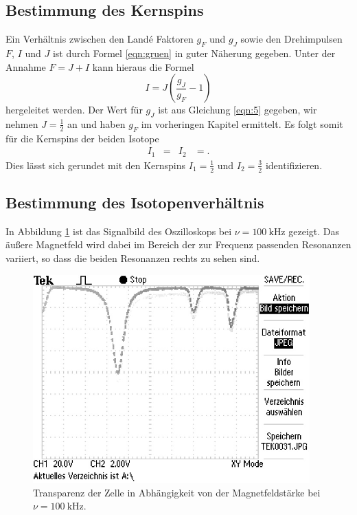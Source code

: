 \subsection{Bestimmung des Kernspins}

Ein Verhältnis zwischen den Land\'{e} Faktoren $g_F$ und $g_J$ sowie den Drehimpulsen $F$, $I$ und $J$ ist durch Formel \eqref{eqn:gruen} in guter Näherung gegeben.
Unter der Annahme $F = J+I$ kann hieraus die Formel
\begin{equation}
  I = J ( \frac{g_J}{g_F} - 1)
\end{equation}
hergeleitet werden.
Der Wert für $g_J$ ist aus Gleichung \eqref{eqn:5} gegeben, wir nehmen $J = \frac{1}{2}$ an und haben $g_F$ im vorheringen Kapitel ermittelt.
Es folgt somit für die Kernspins der beiden Isotope
\begin{align*}
  I_1 &=  & I_2 &= .
\end{align*}
Dies lässt sich gerundet mit den Kernspins $I_1 = \frac{1}{2}$ und $I_2 = \frac{3}{2}$ identifizieren.

\subsection{Bestimmung des Isotopenverhältnis}

In Abbildung \ref{fig:typisch} ist das Signalbild des Oszilloskops bei $\nu = \SI{100}{\kilo\hertz}$ gezeigt.
Das äußere Magnetfeld wird dabei im Bereich der zur Frequenz passenden Resonanzen variiert, so dass die beiden Resonanzen rechts zu sehen sind.

\begin{figure}
  \centering
  \includegraphics[height=8cm]{ressources/TEK0031.png}
  \caption{Transparenz der Zelle in Abhängigkeit von der Magnetfeldstärke bei $\nu = \SI{100}{\kilo\hertz}$.}
  \label{fig:typisch}
\end{figure}

